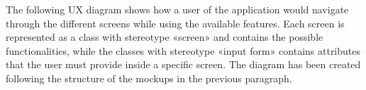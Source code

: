 The following UX diagram shows how a user of the application would navigate through the different screens while using the available features. Each screen is represented as a class with stereotype «screen» and contains the possible functionalities, while the classes with stereotype «input form» contains attributes that the user must provide inside a specific screen. The diagram has been created following the structure of the mockups in the previous paragraph.

\begin{sidewaysfigure}
\centering
\texttt{[image: \{"Images/UI - UX Diagram"]}.png}
\caption{\label{fig:metamodel2}UX Diagram}
\end{sidewaysfigure}